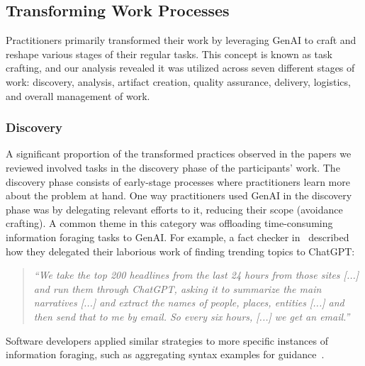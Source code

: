 
\subsection{Transforming Work Processes}
\label{sec:workprocesses}
Practitioners primarily transformed their work by leveraging GenAI to craft and reshape various stages of their regular tasks. This concept is known as task crafting, and our analysis revealed it was utilized across seven different stages of work: discovery, analysis, artifact creation, quality assurance, delivery, logistics, and overall management of work.


\subsubsection{Discovery}
A significant proportion of the transformed practices observed in the papers we reviewed involved tasks in the discovery phase of the participants' work. The discovery phase consists of early-stage processes where practitioners learn more about the problem at hand. One way practitioners used GenAI in the discovery phase was by delegating relevant efforts to it, reducing their scope (avoidance crafting). A common theme in this category was offloading time-consuming information foraging tasks to GenAI. For example, a fact checker in~\cite{1} described how they delegated their laborious work of finding trending topics to ChatGPT:

\begin{quote}
    \textit{``We take the top 200 headlines from the last 24 hours from those sites [...] and run them through ChatGPT, asking it to summarize the main narratives [...] and extract the names of people, places, entities [...] and then send that to me by email. So every six hours, [...] we get an email.''}
\end{quote}

Software developers applied similar strategies to more specific instances of information foraging, such as aggregating syntax examples for guidance~\cite{4}. 

